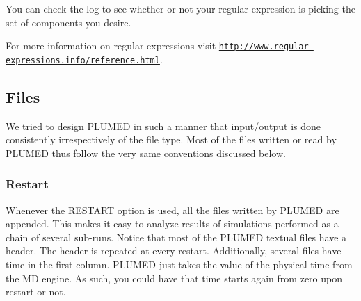 You can check the log to see whether or not your regular expression is picking the set of components you desire.

For more information on regular expressions visit \href{http://www.regular-expressions.info/reference.html}{\tt http\+://www.\+regular-\/expressions.\+info/reference.\+html}. \hypertarget{Files}{}\subsection{Files}\label{Files}
We tried to design P\+L\+U\+M\+E\+D in such a manner that input/output is done consistently irrespectively of the file type. Most of the files written or read by P\+L\+U\+M\+E\+D thus follow the very same conventions discussed below.\hypertarget{_files_Restart}{}\subsubsection{Restart}\label{_files_Restart}
Whenever the \hyperlink{RESTART}{R\+E\+S\+T\+A\+R\+T} option is used, all the files written by P\+L\+U\+M\+E\+D are appended. This makes it easy to analyze results of simulations performed as a chain of several sub-\/runs. Notice that most of the P\+L\+U\+M\+E\+D textual files have a header. The header is repeated at every restart. Additionally, several files have time in the first column. P\+L\+U\+M\+E\+D just takes the value of the physical time from the M\+D engine. As such, you could have that time starts again from zero upon restart or not.

